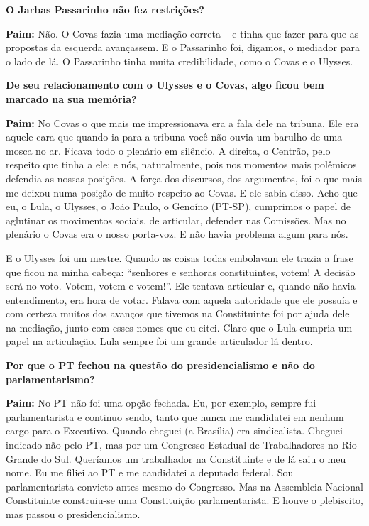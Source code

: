 \textbf{O Jarbas Passarinho não fez restrições?}

\textbf{Paim:} Não. O Covas fazia uma mediação correta -- e tinha que
fazer para que as propostas da esquerda avançassem. E o Passarinho foi,
digamos, o mediador para o lado de lá. O Passarinho tinha muita
credibilidade, como o Covas e o Ulysses.

\textbf{De seu relacionamento com o Ulysses e o Covas, algo ficou bem
marcado na sua memória?}

\textbf{Paim:} No Covas o que mais me impressionava era a fala dele na
tribuna. Ele era aquele cara que quando ia para a tribuna você não ouvia
um barulho de uma mosca no ar. Ficava todo o plenário em silêncio. A
direita, o Centrão, pelo respeito que tinha a ele; e nós, naturalmente,
pois nos momentos mais polêmicos defendia as nossas posições. A força
dos discursos, dos argumentos, foi o que mais me deixou numa posição de
muito respeito ao Covas. E ele sabia disso. Acho que eu, o Lula, o
Ulysses, o João Paulo, o Genoíno (PT-SP), cumprimos o papel de aglutinar
os movimentos sociais, de articular, defender nas Comissões. Mas no
plenário o Covas era o nosso porta-voz. E não havia problema algum para
nós.

E o Ulysses foi um mestre. Quando as coisas todas embolavam ele trazia a
frase que ficou na minha cabeça: ``senhores e senhoras constituintes,
votem! A decisão será no voto. Votem, votem e votem!''. Ele tentava
articular e, quando não havia entendimento, era hora de votar. Falava
com aquela autoridade que ele possuía e com certeza muitos dos avanços
que tivemos na Constituinte foi por ajuda dele na mediação, junto com
esses nomes que eu citei. Claro que o Lula cumpria um papel na
articulação. Lula sempre foi um grande articulador lá dentro.

\textbf{Por que o PT fechou na questão do presidencialismo e não do
parlamentarismo?}

\textbf{Paim:} No PT não foi uma opção fechada. Eu, por exemplo, sempre
fui parlamentarista e continuo sendo, tanto que nunca me candidatei em
nenhum cargo para o Executivo. Quando cheguei (a Brasília) era
sindicalista. Cheguei indicado não pelo PT, mas por um Congresso
Estadual de Trabalhadores no Rio Grande do Sul. Queríamos um trabalhador
na Constituinte e de lá saiu o meu nome. Eu me filiei ao PT e me
candidatei a deputado federal. Sou parlamentarista convicto antes mesmo
do Congresso. Mas na Assembleia Nacional Constituinte construiu-se uma
Constituição parlamentarista. E houve o plebiscito, mas passou o
presidencialismo.

